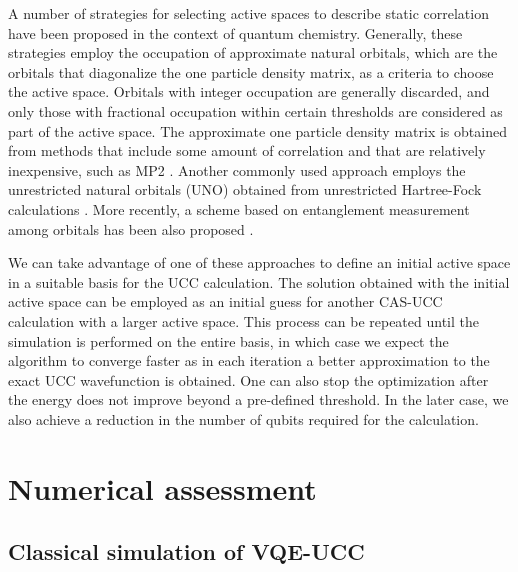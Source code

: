 \documentclass[superscriptaddress,aps,pra,twocolumn,nofootinbib,babel]{revtex4-1}
\begin{document}
A number of strategies for selecting active spaces to describe static correlation have been proposed in the context of quantum chemistry. Generally, these strategies employ the occupation of approximate natural orbitals, which are the orbitals that diagonalize the one particle density matrix, as a criteria to choose the active space. Orbitals with integer occupation are generally discarded, and only those with fractional occupation within certain thresholds are considered as part of the active space. The approximate one particle density matrix is obtained from methods that include some amount of correlation and that are relatively  inexpensive, such as MP2 \cite{jensen.JCP.88.3834.1988}. Another commonly used approach employs the unrestricted natural orbitals (UNO) obtained from unrestricted Hartree-Fock calculations \cite{abrams.CPL.395.227.2004,keller.JCP.142.244104.2015}. More recently, a scheme based on entanglement measurement among orbitals has been also proposed \cite{stein.JCTC.12.1760.2016}.

We can take advantage of one of these approaches to define an initial active space in a suitable basis for the UCC calculation. The solution obtained with the initial active space can be employed as an initial guess for another CAS-UCC calculation with a larger active space. This process can be repeated until the simulation is performed on the entire basis, in which case we expect the algorithm to converge faster as in each iteration a better approximation to the exact UCC wavefunction is obtained. One can also stop the optimization after the energy does not improve beyond a pre-defined threshold. In the later case, we also achieve a reduction in the number of qubits required for the calculation.

\section{Numerical assessment}\label{sec:numerics}

\subsection{Classical simulation of VQE-UCC}

\end{document}
